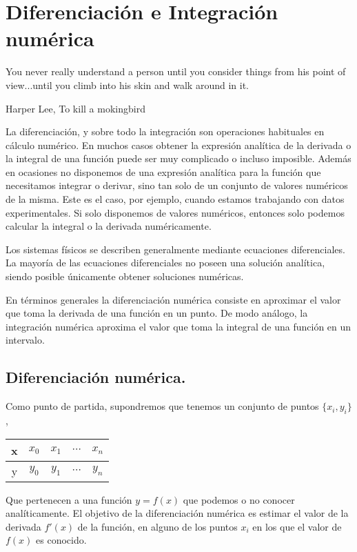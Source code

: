 \chapter{Diferenciación e Integración numérica}

\epigraph{You never really understand a person until you consider things from his point of view...until you climb into his skin and walk around in it.}{Harper Lee, To kill a mokingbird}

La diferenciación, y sobre todo la integración son operaciones habituales en cálculo numérico. En muchos casos obtener la expresión analítica de la derivada o la integral de una función puede ser muy complicado o incluso imposible. Además en ocasiones no disponemos de una expresión analítica para la función que necesitamos integrar o derivar, sino tan solo de un conjunto de valores numéricos de la misma. Este es el caso, por ejemplo, cuando estamos trabajando con datos experimentales. Si solo disponemos de valores numéricos, entonces solo podemos calcular la integral o la derivada numéricamente.

Los sistemas físicos se describen generalmente mediante ecuaciones diferenciales.  La mayoría de las ecuaciones diferenciales no poseen una solución analítica, siendo posible únicamente obtener soluciones numéricas. 

En términos generales la diferenciación numérica consiste en aproximar el valor que toma la derivada de una función en un punto. De modo análogo, la integración numérica aproxima el valor que toma la integral de una función en un intervalo.

\section{Diferenciación numérica.}

Como punto de partida, supondremos que tenemos un conjunto de puntos $\{x_i,y_i\}$,
\begin{table}[h]
\centering
\begin{tabular}{c|cccc}
x&$x_0$&$x_1$&$\cdots$&$x_n$\\
\hline
y&$y_0$&$y_1$&$\cdots$&$y_n$
\end{tabular}
\end{table} 

Que pertenecen a una función $y=f(x)$ que podemos o no conocer analíticamente. El objetivo de la diferenciación numérica es estimar el valor de la derivada $f'(x)$ de la función, en alguno de los puntos $x_i$ en los que el valor de $f(x)$ es conocido. 

